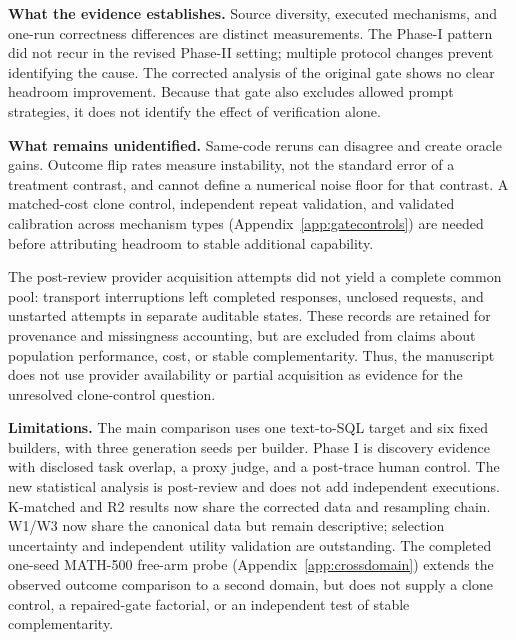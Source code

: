 \textbf{What the evidence establishes.} Source diversity, executed
mechanisms, and one-run correctness differences are distinct measurements.
The Phase-I pattern did not recur in the revised Phase-II setting; multiple
protocol changes prevent identifying the cause. The corrected analysis of
the original gate shows no clear headroom improvement. Because that gate
also excludes allowed prompt strategies, it does not identify the effect
of verification alone.

\textbf{What remains unidentified.} Same-code reruns can disagree and
create oracle gains. Outcome flip rates measure instability, not the
standard error of a treatment contrast, and cannot define a numerical
noise floor for that contrast. A matched-cost clone control, independent
repeat validation, and validated calibration across mechanism types
(Appendix~\ref{app:gatecontrols})
are needed before attributing headroom to stable additional capability.


The post-review provider acquisition attempts did not yield a complete common pool: transport interruptions left completed responses, unclosed requests, and unstarted attempts in separate auditable states. These records are retained for provenance and missingness accounting, but are excluded from claims about population performance, cost, or stable complementarity. Thus, the manuscript does not use provider availability or partial acquisition as evidence for the unresolved clone-control question.

\textbf{Limitations.} The main comparison uses one text-to-SQL target and
six fixed builders, with three generation seeds per builder. Phase I is
discovery evidence with disclosed task overlap, a proxy judge, and a
post-trace human control. The new statistical analysis is post-review and
does not add independent executions. K-matched and R2 results now share the
corrected data and resampling chain. W1/W3 now share the canonical data
but remain descriptive; selection uncertainty and independent utility
validation are outstanding.
The completed one-seed MATH-500 free-arm probe
(Appendix~\ref{app:crossdomain}) extends the observed outcome comparison
to a second domain, but does not supply a clone control, a repaired-gate
factorial, or an independent test of stable complementarity.
